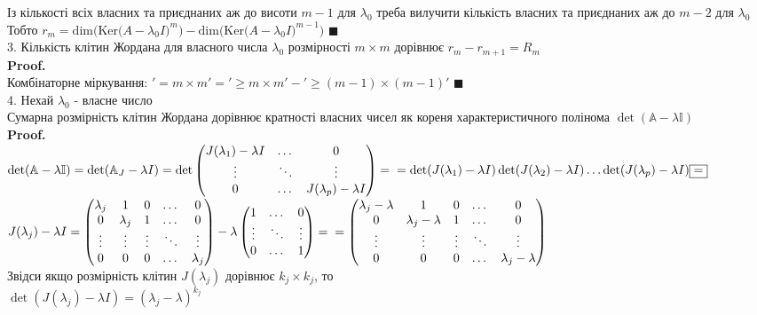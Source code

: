 \documentclass[a4paper, 14pt]{extarticle}
\def\proof{\textbf{Proof.}\\}
\def\bigline{\vspace{5mm}\\}
\def\qed{$\blacksquare$}
\def\dim#1{\textrm{dim} {#1}}
\def\ker#1{\textrm{Ker} {#1}}
\begin{document}
Із кількості всіх власних та приєднаних аж до висоти $m-1$ для $\lambda_0$ треба вилучити кількість власних та приєднаних аж до $m-2$ для $\lambda_0$\\
Тобто $r_m = \dim(\ker(A-\lambda_0 I)^m) - \dim(\ker(A-\lambda_0 I)^{m-1})$ \qed
\bigline
3. Кількість клітин Жордана для власного числа $\lambda_0$ розмірності $m \times m$ дорівнює $r_m - r_{m+1} = R_m$\\
\proof
Комбінаторне міркування: $'=m \times m' = '\geq m \times m' - '\geq (m-1) \times (m-1)'$ \qed
\bigline
4. Нехай $\lambda_0$ - власне число\\
Сумарна розмірність клітин Жордана дорівнює кратності власних чисел як кореня характеристичного полінома $\det (\mathbb{A} - \lambda \mathbb{I})$\\
\proof
$\det (\mathbb{A} - \lambda \mathbb{I}) = \det (\mathbb{A}_{J} - \lambda I) = \det \begin{pmatrix}
J(\lambda_1) - \lambda I & \dots & 0 \\
\vdots & \ddots & \vdots \\
0 & \dots & J(\lambda_p) - \lambda I
\end{pmatrix} = \\ = \det(J(\lambda_1)-\lambda I) \det(J(\lambda_2)-\lambda I) \dots \det(J(\lambda_p)-\lambda I) \boxed{=} \\
$
$J(\lambda_j)-\lambda I = \begin{pmatrix}
\lambda_j & 1 & 0 & \dots & 0 \\
0 & \lambda_j & 1 & \dots & 0 \\
\vdots & \vdots & \vdots & \ddots & \vdots \\
0 & 0 & 0 & \dots & \lambda_j
\end{pmatrix} - \lambda \begin{pmatrix}
1 & \dots & 0 \\
\vdots & \ddots & \vdots \\
0 & \dots & 1 \\
\end{pmatrix} = \\ = \begin{pmatrix}
\lambda_j - \lambda & 1 & 0 & \dots & 0 \\
0 & \lambda_j - \lambda & 1 & \dots & 0 \\
\vdots & \vdots & \vdots & \ddots & \vdots \\
0 & 0 & 0 & \dots & \lambda_j - \lambda
\end{pmatrix}$\\
Звідси якщо розмірність клітин $J(\lambda_j)$ дорівнює $k_j \times k_j$, то \\ $\det (J(\lambda_j) - \lambda I) = (\lambda_j - \lambda)^{k_j}$\\
\end{document}
